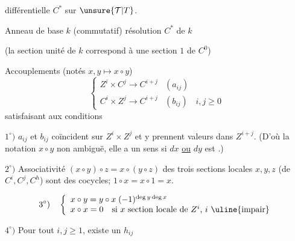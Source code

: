  différentielle $C^*$ sur  $\unsure{\mathcal T|T}$.

Anneau de base $k$ (commutatif)
résolution $C^*$ de $k$



(la section unité de $k$ correspond à une section $1$ de $C^0$)


Accouplements (notés $x,y\longmapsto x\circ y$)
\[
\left\{\begin{array}{lll}
Z^i\times C^j\longrightarrow C^{i+j}&(a_{ij})\\
C^i\times Z^j\longrightarrow C^{i+j}&(b_{ij})&i,j\geq0
\end{array}\right.
\]
satisfaisant aux conditions

$1^\circ)$ $a_{ij}$ et $b_{ij}$ coïncident sur $Z^i\times Z^j$ et
y prennent valeurs dans $Z^{i+j}$. (D'où la notation
$x\circ y$ non ambiguë, elle a un sens si $dx$ \uline{ou} $dy$ est .)

$2^\circ)$ Associativité $(x\circ y)\circ z=x\circ(y\circ z)$ 
des trois sections locales $x,y,z$ (de $C^i,C^j,C^h$)
sont des cocycles; $1\circ x=x\circ1=x$.

\[
3^\circ)\quad\left\{\begin{array}{l}
x\circ y=y\circ x\;(-1)^{\deg y\deg x}\\
x\circ x=0\quad\text{si $x$ section locale de $Z^i$, $i$ \uline{impair}}
\end{array}\right.
\]


$4^\circ)$ Pour tout $i,j\geq1$, existe un $h_{ij}$ 

